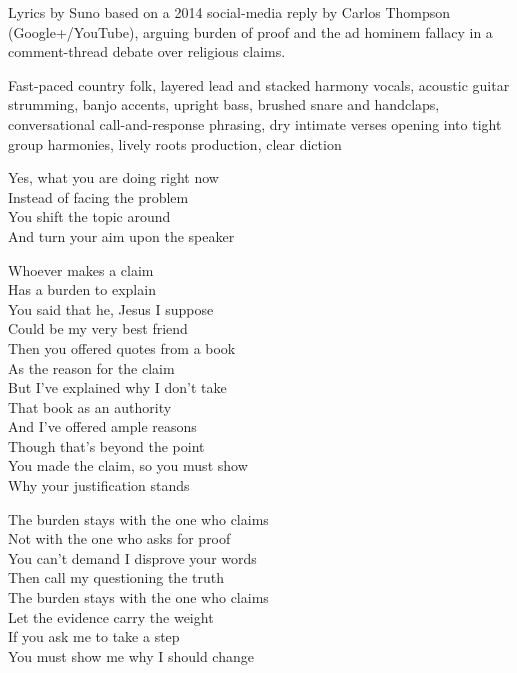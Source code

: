 
\begin{notes}
Lyrics by Suno based on a 2014 social-media reply by Carlos Thompson (Google+/YouTube), arguing burden of proof and the ad hominem fallacy in a comment-thread debate over religious claims.
\end{notes}
\begin{style}
Fast-paced country folk, layered lead and stacked harmony vocals, acoustic guitar strumming, banjo accents, upright bass, brushed snare and handclaps, conversational call-and-response phrasing, dry intimate verses opening into tight group harmonies, lively roots production, clear diction
\end{style}
\begin{lyrics}
Yes, what you are doing right now\\
Instead of facing the problem\\
You shift the topic around\\
And turn your aim upon the speaker

Whoever makes a claim\\
Has a burden to explain\\
You said that he, Jesus I suppose\\
Could be my very best friend\\
Then you offered quotes from a book\\
As the reason for the claim\\
But I've explained why I don't take\\
That book as an authority\\
And I've offered ample reasons\\
Though that's beyond the point\\
You made the claim, so you must show\\
Why your justification stands

The burden stays with the one who claims\\
Not with the one who asks for proof\\
You can't demand I disprove your words\\
Then call my questioning the truth\\
The burden stays with the one who claims\\
Let the evidence carry the weight\\
If you ask me to take a step\\
You must show me why I should change


\end{lyrics}
